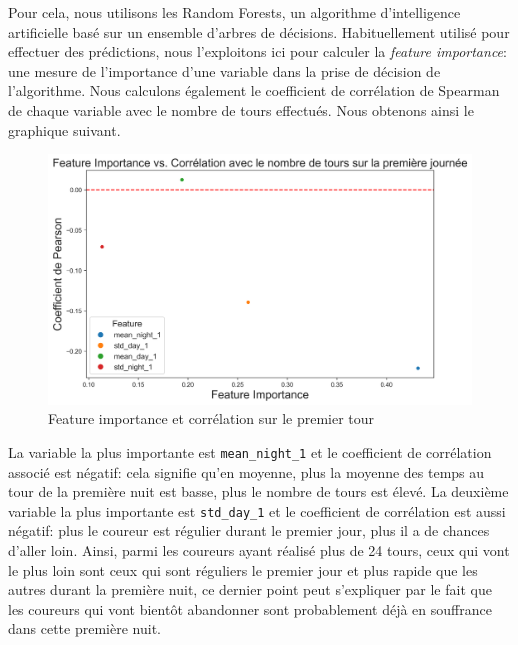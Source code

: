 \documentclass[a4paper,12pt]{article}
\begin{document}
\medskip

Pour cela, nous utilisons les Random Forests, un algorithme d'intelligence artificielle basé sur un ensemble d'arbres de décisions. Habituellement utilisé pour effectuer des prédictions, nous l'exploitons ici pour calculer la \textit{feature importance}: une mesure de l'importance d'une variable dans la prise de décision de l'algorithme. Nous calculons également le coefficient de corrélation de Spearman de chaque variable avec le nombre de tours effectués. Nous obtenons ainsi le graphique suivant.
\begin{figure}[!h]
	
	\includegraphics[scale=0.41]{feature1}
	\centering
	\caption{Feature importance et corrélation sur le premier tour}
\end{figure}




La variable la plus importante est \texttt{mean\_night\_1} et le coefficient de corrélation associé est négatif: cela signifie qu'en moyenne, plus la moyenne des temps au tour de la première nuit est basse, plus le nombre de tours est élevé. La deuxième variable la plus importante est \texttt{std\_day\_1} et le coefficient de corrélation est aussi négatif: plus le coureur est régulier durant le premier jour, plus il a de chances d'aller loin. Ainsi, parmi les coureurs ayant réalisé plus de 24 tours, ceux qui vont le plus loin sont ceux qui sont réguliers le premier jour et plus rapide que les autres durant la première nuit, ce dernier point peut s'expliquer par le fait que les coureurs qui vont bientôt abandonner sont probablement déjà en souffrance dans cette première nuit.
\medskip
\end{document}
